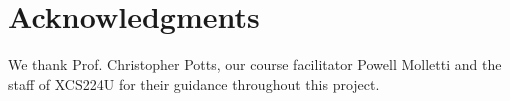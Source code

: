 \section*{Acknowledgments}

We thank Prof. Christopher Potts, our course facilitator Powell Molletti and the staff of XCS224U for their guidance throughout this project.